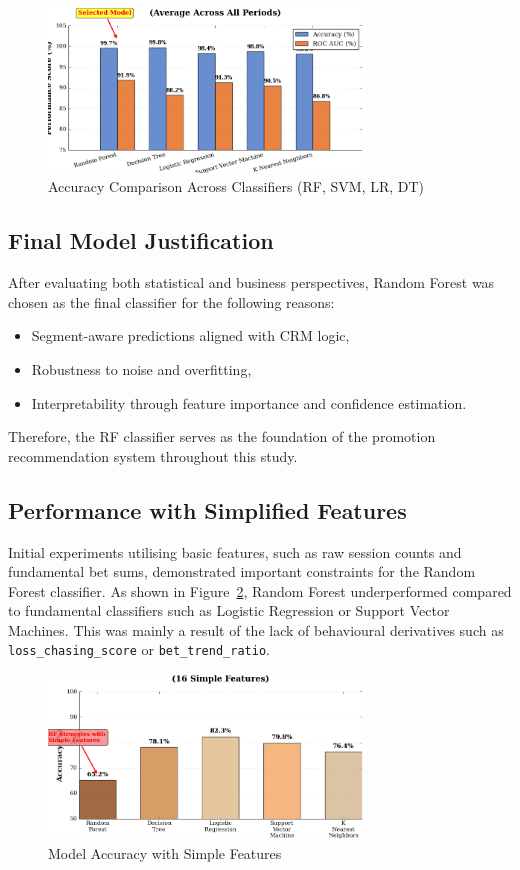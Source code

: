 \documentclass[12pt,a4paper]{report}
\begin{document}
\begin{figure}[H]
    \centering
    \includegraphics[width=0.75\textwidth]{figures/model_accuracy_comparison.png}
    \caption{Accuracy Comparison Across Classifiers (RF, SVM, LR, DT)}
    \label{fig:model_accuracy_comparison}
\end{figure}

\subsection*{Final Model Justification}
After evaluating both statistical and business perspectives, Random Forest was chosen as the final classifier for the following reasons:
\begin{itemize}
    \item Segment-aware predictions aligned with CRM logic,
    \item Robustness to noise and overfitting,
    \item Interpretability through feature importance and confidence estimation.
\end{itemize}
Therefore, the RF classifier serves as the foundation of the promotion recommendation system throughout this study.

\subsection{Performance with Simplified Features}
Initial experiments utilising basic features, such as raw session counts and fundamental bet sums, demonstrated important constraints for the Random Forest classifier. As shown in Figure~\ref{fig:rf_simple}, Random Forest underperformed compared to fundamental classifiers such as Logistic Regression or Support Vector Machines.  This was mainly a result of the lack of behavioural derivatives such as \texttt{loss\_chasing\_score} or  \texttt{bet\_trend\_ratio}.

\begin{figure}[H]
    \centering
    \includegraphics[width=0.75\textwidth]{figures/rf_with_simple_features.png}
    \caption{Model Accuracy with Simple Features}
    \label{fig:rf_simple}
\end{figure}
\end{document}
